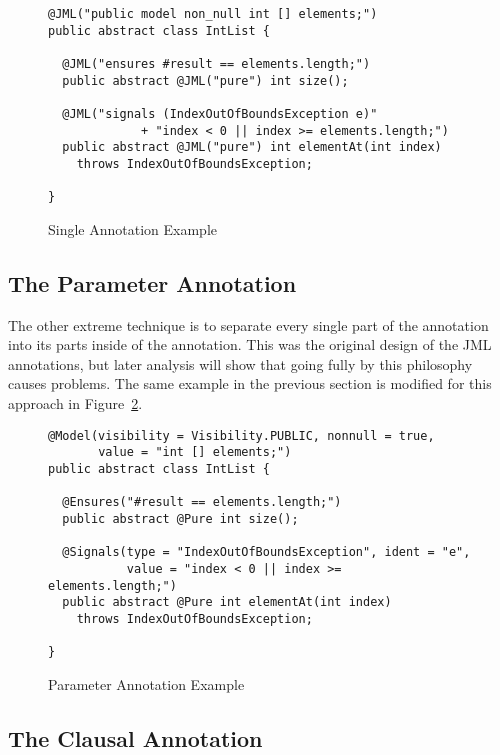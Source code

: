 \documentclass{llncs}
\newcommand{\fignref}[1]{Figure~\ref{#1}}
\begin{document}
\begin{figure}[ht]
\begin{lstlisting}[language={[JML5]Java}]
@JML("public model non_null int [] elements;")
public abstract class IntList {

  @JML("ensures #result == elements.length;")
  public abstract @JML("pure") int size();
        
  @JML("signals (IndexOutOfBoundsException e)"
             + "index < 0 || index >= elements.length;")
  public abstract @JML("pure") int elementAt(int index) 
    throws IndexOutOfBoundsException;

}
\end{lstlisting}
\caption{Single Annotation Example}
\label{fig-SingleAnnotationExample}
\end{figure}

\subsection{The Parameter Annotation}

The other extreme technique is to separate every single part of the annotation into its parts inside of the annotation.  This was the original design of the JML annotations, but later analysis will show that going fully by this philosophy causes problems.  The same example in the previous section is modified for this approach in \fignref{fig-ParameterAnnotationExample}.

\begin{figure}[ht]
\begin{lstlisting}[language={[JML5]Java}]
@Model(visibility = Visibility.PUBLIC, nonnull = true, 
       value = "int [] elements;")
public abstract class IntList {

  @Ensures("#result == elements.length;")
  public abstract @Pure int size();
        
  @Signals(type = "IndexOutOfBoundsException", ident = "e",
           value = "index < 0 || index >= elements.length;")
  public abstract @Pure int elementAt(int index) 
    throws IndexOutOfBoundsException;

}     
\end{lstlisting}
\caption{Parameter Annotation Example}
\label{fig-ParameterAnnotationExample}
\end{figure}

\subsection{The Clausal Annotation}
\end{document}

